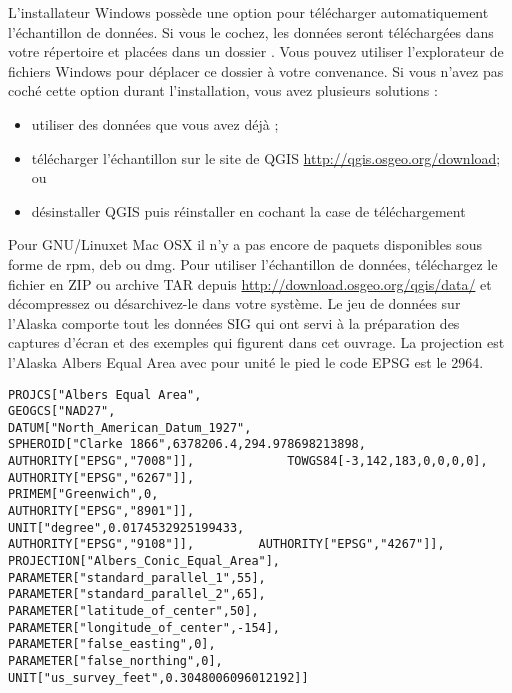 \win L'installateur Windows poss\`ede une option pour t\'el\'echarger automatiquement l'\'echantillon de donn\'ees. Si vous le cochez, les donn\'ees seront t\'el\'echarg\'ees dans votre r\'epertoire  et plac\'ees dans un dossier . Vous pouvez utiliser l'explorateur de fichiers Windows pour d\'eplacer ce dossier \`a votre convenance. Si vous n'avez pas coch\'e cette option durant l'installation, vous avez plusieurs solutions : 
\begin{itemize} 
\item utiliser des donn\'ees que vous avez d\'ej\`a ;
\item t\'el\'echarger l'\'echantillon sur le site de QGIS \url{http://qgis.osgeo.org/download}; ou 
\item d\'esinstaller QGIS  puis r\'einstaller en cochant la case de t\'el\'echargement 
\end{itemize}

\nix \osx Pour GNU/Linuxet Mac OSX il n'y a pas encore de paquets disponibles sous forme de rpm, deb ou dmg. Pour utiliser l'\'echantillon de donn\'ees, t\'el\'echargez le fichier  en ZIP ou archive TAR depuis  \url{http://download.osgeo.org/qgis/data/} et d\'ecompressez ou d\'esarchivez-le dans votre syst\`eme. Le jeu de donn\'ees sur l'Alaska comporte tout les donn\'ees SIG qui ont servi \`a la pr\'eparation des captures d'\'ecran et des exemples qui figurent dans cet ouvrage. La projection est l'Alaska Albers Equal Area avec pour unit\'e le pied le code EPSG est le 2964.

\begin{verbatim}
PROJCS["Albers Equal Area",   
GEOGCS["NAD27",   
DATUM["North_American_Datum_1927",   
SPHEROID["Clarke 1866",6378206.4,294.978698213898,   
AUTHORITY["EPSG","7008"]],             TOWGS84[-3,142,183,0,0,0,0],             AUTHORITY["EPSG","6267"]],   
PRIMEM["Greenwich",0,   
AUTHORITY["EPSG","8901"]],   
UNIT["degree",0.0174532925199433,   
AUTHORITY["EPSG","9108"]],         AUTHORITY["EPSG","4267"]],   
PROJECTION["Albers_Conic_Equal_Area"],   
PARAMETER["standard_parallel_1",55],   
PARAMETER["standard_parallel_2",65],   
PARAMETER["latitude_of_center",50],   
PARAMETER["longitude_of_center",-154],   
PARAMETER["false_easting",0],   
PARAMETER["false_northing",0],   
UNIT["us_survey_feet",0.3048006096012192]] \end{verbatim}


